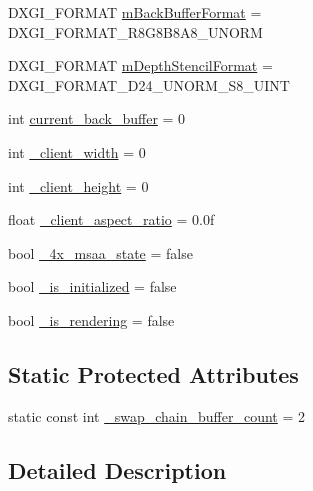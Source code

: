 \begin{DoxyCompactItemize}
\item 
D\+X\+G\+I\+\_\+\+F\+O\+R\+M\+AT \hyperlink{class_direct_x_renderer_a10f81ee4e50481b1d5589f72fb5698f4_a10f81ee4e50481b1d5589f72fb5698f4}{m\+Back\+Buffer\+Format} = D\+X\+G\+I\+\_\+\+F\+O\+R\+M\+A\+T\+\_\+\+R8\+G8\+B8\+A8\+\_\+\+U\+N\+O\+RM
\item 
D\+X\+G\+I\+\_\+\+F\+O\+R\+M\+AT \hyperlink{class_direct_x_renderer_a1f7901ccfc61d85b80f94d7de0fef163_a1f7901ccfc61d85b80f94d7de0fef163}{m\+Depth\+Stencil\+Format} = D\+X\+G\+I\+\_\+\+F\+O\+R\+M\+A\+T\+\_\+\+D24\+\_\+\+U\+N\+O\+R\+M\+\_\+\+S8\+\_\+\+U\+I\+NT
\item 
int \hyperlink{class_direct_x_renderer_a54e1d05a31bf58261c4264d37a1cd901_a54e1d05a31bf58261c4264d37a1cd901}{current\+\_\+back\+\_\+buffer} = 0
\item 
int \hyperlink{class_direct_x_renderer_a4a4d32ddd237330da18828e7ba812ab6_a4a4d32ddd237330da18828e7ba812ab6}{\+\_\+client\+\_\+width} = 0
\item 
int \hyperlink{class_direct_x_renderer_a864235b89a260f249463e0892d8def67_a864235b89a260f249463e0892d8def67}{\+\_\+client\+\_\+height} = 0
\item 
float \hyperlink{class_direct_x_renderer_aee71c028a66feadb85a8df3a48fee6d3_aee71c028a66feadb85a8df3a48fee6d3}{\+\_\+client\+\_\+aspect\+\_\+ratio} = 0.\+0f
\item 
bool \hyperlink{class_direct_x_renderer_a6f8fb7149965da8c2812d30873f3eadc_a6f8fb7149965da8c2812d30873f3eadc}{\+\_\+4x\+\_\+msaa\+\_\+state} = false
\item 
bool \hyperlink{class_direct_x_renderer_a31ae4c3ff3837f963cda60bf19f765e3_a31ae4c3ff3837f963cda60bf19f765e3}{\+\_\+is\+\_\+initialized} = false
\item 
bool \hyperlink{class_direct_x_renderer_aeb385222af964c11d944f758ae9fb4fc_aeb385222af964c11d944f758ae9fb4fc}{\+\_\+is\+\_\+rendering} = false
\end{DoxyCompactItemize}
\subsection*{Static Protected Attributes}
\begin{DoxyCompactItemize}
\item 
static const int \hyperlink{class_direct_x_renderer_aaf675ecf10cb34d5247f78920f8851da_aaf675ecf10cb34d5247f78920f8851da}{\+\_\+swap\+\_\+chain\+\_\+buffer\+\_\+count} = 2
\end{DoxyCompactItemize}


\subsection{Detailed Description}


